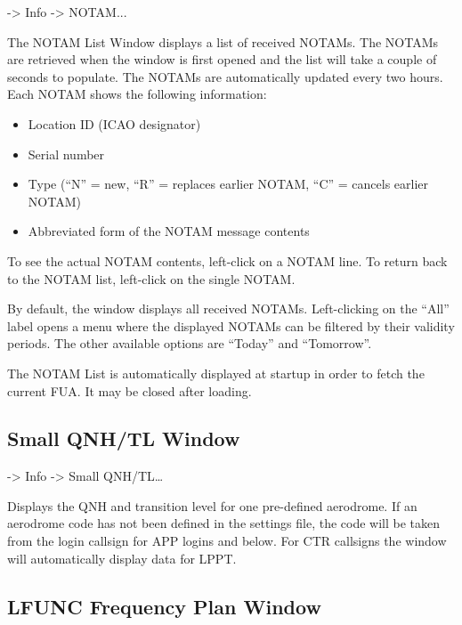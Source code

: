 \documentclass[a4paper,oneside,11pt]{memoir}
\begin{document}
 -> Info -> NOTAM...

\bigskip


The NOTAM List Window displays a list of received NOTAMs. The NOTAMs are retrieved when the window is first opened and the list will take a couple of seconds to populate. The NOTAMs are automatically updated every two hours. Each NOTAM shows the following information:

\begin{itemize}
    \item Location ID (ICAO designator)
    \item Serial number
    \item Type (“N” = new, “R” = replaces earlier NOTAM, “C” = cancels earlier NOTAM)
    \item Abbreviated form of the NOTAM message contents
\end{itemize}

\bigskip

To see the actual NOTAM contents, left-click on a NOTAM line. To return back to the NOTAM list, left-click on the single NOTAM.

\bigskip

By default, the window displays all received NOTAMs. Left-clicking on the “All” label opens a menu where the displayed NOTAMs can be filtered by their validity periods. The other available options are “Today” and “Tomorrow”.

\bigskip

The NOTAM List is automatically displayed at startup in order to fetch the current FUA. It may be closed after loading.

\subsection{Small QNH/TL Window}\label{win:sqnhw}

 -> Info -> Small QNH/TL…


Displays the QNH and transition level for one pre-defined aerodrome. If an aerodrome code has not been defined in the settings file, the code will be taken from the login callsign for APP logins and below. For CTR callsigns the window will automatically display data for LPPT.

\subsection{LFUNC Frequency Plan Window}
\label{win:lfunc}
\end{document}
